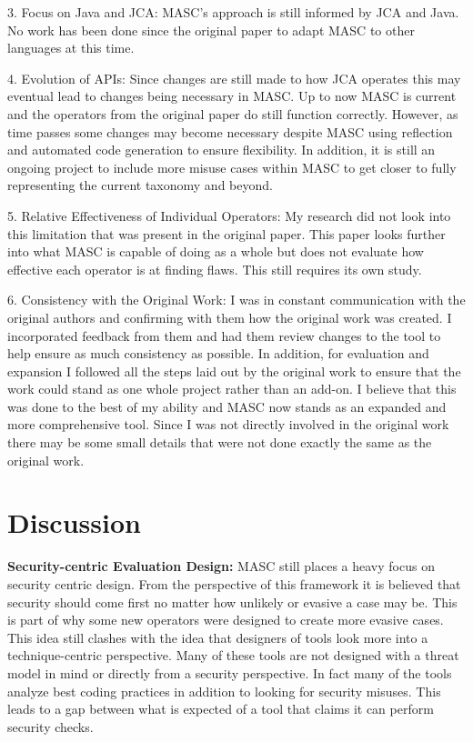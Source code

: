 3. Focus on Java and JCA: MASC's approach is still informed by JCA and Java. No work has been done since the original paper to adapt MASC to other languages at this time.

4. Evolution of APIs: Since changes are still made to how JCA operates this may eventual lead to changes being necessary in MASC. Up to now MASC is current and the operators from the original paper do still function correctly. However, as time passes some changes may become necessary despite MASC using reflection and automated code generation to ensure flexibility. In addition, it is still an ongoing project to include more misuse cases within MASC to get closer to fully representing the current taxonomy and beyond.

5. Relative Effectiveness of Individual Operators: My research did not look into this limitation that was present in the original paper. This paper looks further into what MASC is capable of doing as a whole but does not evaluate how effective each operator is at finding flaws. This still requires its own study.

6. Consistency with the Original Work: I was in constant communication with the original authors and confirming with them how the original work was created. I incorporated feedback from them and had them review changes to the tool to help ensure as much consistency as possible. In addition, for evaluation and expansion I followed all the steps laid out by the original work to ensure that the work could stand as one whole project rather than an add-on. I believe that this was done to the best of my ability and MASC now stands as an expanded and more comprehensive tool. Since I was not directly involved in the original work there may be some small details that were not done exactly the same as the original work.

\section{Discussion}
\label{ch6:sec:discussion}

\textbf{Security-centric Evaluation Design:}
MASC still places a heavy focus on security centric design. From the perspective of this framework it is believed that security should come first no matter how unlikely or evasive a case may be. This is part of why some new operators were designed to create more evasive cases. This idea still clashes with the idea that designers of tools look more into a technique-centric perspective. Many of these tools are not designed with a threat model in mind or directly from a security perspective. In fact many of the tools analyze best coding practices in addition to looking for security misuses. This leads to a gap between what is expected of a tool that claims it can perform security checks.

